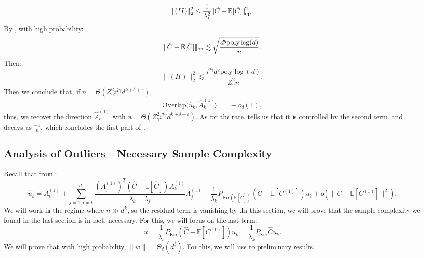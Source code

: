 \documentclass[]{article}
\numberwithin{equation}{section}
\theoremstyle{definition}
\newcommand{\EE}{\mathbb{E}}
\def\op{{\rm op}}
\begin{document}
\begin{equation}
    \| (II)\|_2^{2} \leq \dfrac{1}{\lambda_i^{2}}\|\hat{C} - \EE [\hat{C}] \|_\op^{2}.
\end{equation}
By , with high probability: 
\begin{equation}
    \|\hat{C} - \EE [\hat{C}] \|_\op \lesssim  \sqrt{\dfrac{d^{q}\mathrm{poly}\log(d)}{n}}. 
\end{equation}
Then: 
\begin{equation}
    \| (II)\|_2^{2}  \lesssim  \dfrac{i^{2\gamma} d^{q}\mathrm{poly}\log(d)}{Z_{\gamma}^{2}n}. 
    \label{eq:II_is_small}
\end{equation}
Then we conclude that, if $n = \Theta(Z_\gamma^{2} i^{2\gamma}d^{k + \delta + \varepsilon} )$, 
\begin{equation}
    \mathrm{Overlap}(\hat{u}_{k}, \hat{A}^{(1)}_{k} \rangle = 1 - o_{d}(1), 
\end{equation}
thus, we recover the direction $\hat{A}^{(1)}_{k}$ with $n = \Theta(Z_\gamma^{2} i^{2\gamma}d^{k + \delta + \varepsilon} )$. As for the rate,   tells us that it is controlled by the second term, and decays as $\frac{-1}{n}$, which concludes the first part of . 


\subsection{Analysis of Outliers - Necessary Sample Complexity}

\label{appendix:proof_thm_2}
Recall that from : 
\begin{equation}
    \hat{u}_{k} = A^{(1)}_{k } + \sum_{j=1, j \not = k}^{d_1} \dfrac{(A^{(1)}_{j })^T (\hat{C} - \EE [\hat{C}])A^{(1)}_{k }}{ \lambda_k - \lambda_j } A^{(1)}_{j} + \dfrac{1}{\lambda_{k}} P_{\mathrm{Ker}(\EE[\hat{C}])} (\hat{C} - \mathbb{E}[C^{(1)}] )u_{k} + o(\| \hat{C} - \mathbb{E}[C^{(1)}] \|^{2}). 
\end{equation}
We will work in the regime where $n \gg d^{k}$, so the residual term is vanishing by .In this section, we will prove that the sample complexity we found in the last section is in fact, necessary. For this, we will focus on the last term: 
\begin{equation}
     w = \dfrac{1}{\lambda_{k}} P_{\mathrm{Ker}} (\hat{C} - \mathbb{E}[C^{(1)}] )u_{k}=  \dfrac{1}{\lambda_{k}} P_{\mathrm{Ker}} \hat{C} u_{k}. 
\end{equation}
We will prove that with high probability, $\| w\| = \Theta_{d}(d^{\frac{\delta}{2}})$. For this, we will use to preliminary results. 
\end{document}
